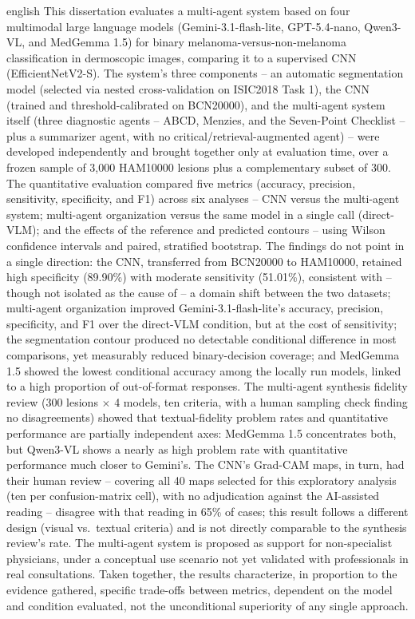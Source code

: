 \captionsenglish
\begin{resumo}
\begin{otherlanguage*}{english}
This dissertation evaluates a multi-agent system based on four multimodal large language models (Gemini-3.1-flash-lite, GPT-5.4-nano, Qwen3-VL, and MedGemma 1.5) for binary melanoma-versus-non-melanoma classification in dermoscopic images, comparing it to a supervised CNN (EfficientNetV2-S). The system's three components -- an automatic segmentation model (selected via nested cross-validation on ISIC2018 Task 1), the CNN (trained and threshold-calibrated on BCN20000), and the multi-agent system itself (three diagnostic agents -- ABCD, Menzies, and the Seven-Point Checklist -- plus a summarizer agent, with no critical/retrieval-augmented agent) -- were developed independently and brought together only at evaluation time, over a frozen sample of 3,000 HAM10000 lesions plus a complementary subset of 300. The quantitative evaluation compared five metrics (accuracy, precision, sensitivity, specificity, and F1) across six analyses -- CNN versus the multi-agent system; multi-agent organization versus the same model in a single call (direct-VLM); and the effects of the reference and predicted contours -- using Wilson confidence intervals and paired, stratified bootstrap. The findings do not point in a single direction: the CNN, transferred from BCN20000 to HAM10000, retained high specificity (89.90\%) with moderate sensitivity (51.01\%), consistent with -- though not isolated as the cause of -- a domain shift between the two datasets; multi-agent organization improved Gemini-3.1-flash-lite's accuracy, precision, specificity, and F1 over the direct-VLM condition, but at the cost of sensitivity; the segmentation contour produced no detectable conditional difference in most comparisons, yet measurably reduced binary-decision coverage; and MedGemma 1.5 showed the lowest conditional accuracy among the locally run models, linked to a high proportion of out-of-format responses. The multi-agent synthesis fidelity review (300 lesions $\times$ 4 models, ten criteria, with a human sampling check finding no disagreements) showed that textual-fidelity problem rates and quantitative performance are partially independent axes: MedGemma 1.5 concentrates both, but Qwen3-VL shows a nearly as high problem rate with quantitative performance much closer to Gemini's. The CNN's Grad-CAM maps, in turn, had their human review -- covering all 40 maps selected for this exploratory analysis (ten per confusion-matrix cell), with no adjudication against the AI-assisted reading -- disagree with that reading in 65\% of cases; this result follows a different design (visual vs.\ textual criteria) and is not directly comparable to the synthesis review's rate. The multi-agent system is proposed as support for non-specialist physicians, under a conceptual use scenario not yet validated with professionals in real consultations. Taken together, the results characterize, in proportion to the evidence gathered, specific trade-offs between metrics, dependent on the model and condition evaluated, not the unconditional superiority of any single approach.


\end{otherlanguage*}
\end{resumo}
